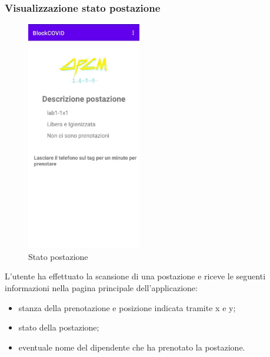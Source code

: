 \subsubsection{Visualizzazione stato postazione}
\begin{figure}[H]
	\centering
	\includegraphics[width=5cm]{res/images/DescrizionePostazione1.png}
	\caption{Stato postazione}
\end{figure}
L'utente ha effettuato la scansione di una postazione e riceve le seguenti informazioni nella pagina principale dell'applicazione:
\begin{itemize}
	\item stanza della prenotazione e posizione indicata tramite x e y;
	\item stato della postazione;
	\item eventuale nome del dipendente che ha prenotato la postazione.
\end{itemize}
 
